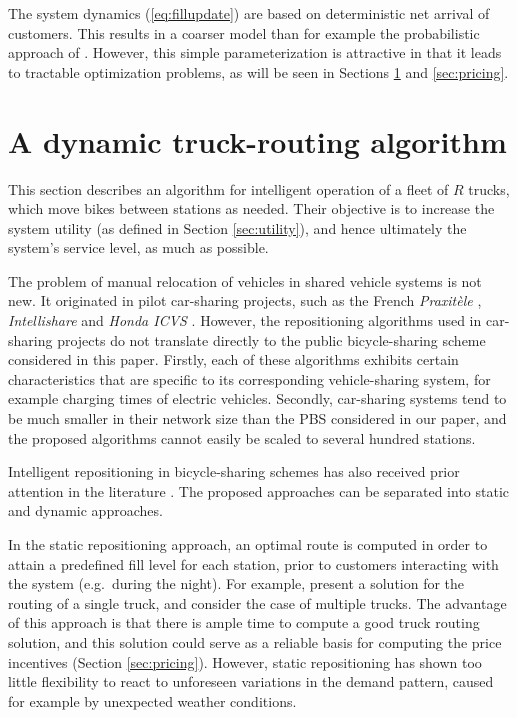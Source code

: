 \documentclass{article}
\begin{document}
The system dynamics (\ref{eq:fillupdate}) are based on deterministic net arrival
of customers. This results in a coarser model than for example the probabilistic
approach of \cite{raviv_optimal_2013}. However, this simple parameterization is
attractive in that it leads to tractable optimization problems, as will be seen
in Sections \ref{sec:trucks} and \ref{sec:pricing}.

\section{A dynamic truck-routing algorithm}
\label{sec:trucks}

This section describes an algorithm for intelligent operation of a fleet of
$R$ trucks, which move bikes between stations as needed. Their objective
is to increase the system utility (as defined in Section \ref{sec:utility}), and
hence ultimately the system's service level, as much as possible.

The problem of manual relocation of vehicles in shared vehicle systems is not
new. It originated in pilot car-sharing projects, such as the French
\emph{Praxitèle} \cite{dror_redistribution_1998,duron_analysis_2000},
\emph{Intellishare} \cite{barth2004} and \emph{Honda ICVS}
\cite{kek_decision_2009}. However, the repositioning algorithms used in
car-sharing projects do not translate directly to the public bicycle-sharing
scheme considered in this paper. Firstly, each of these algorithms exhibits
certain characteristics that are specific to its corresponding vehicle-sharing
system, for example charging times of electric vehicles. Secondly, car-sharing systems
tend to be much smaller in their network size than the PBS considered in our
paper, and the proposed algorithms cannot easily be scaled to several hundred stations.

Intelligent repositioning in bicycle-sharing schemes has also received prior
attention in the literature \cite{shaheen_bikesharing_2010}. The proposed
approaches can be separated into static and dynamic approaches.

In the static repositioning approach, an optimal route is computed in order to
attain a predefined fill level for each station, prior to customers interacting
with the system (e.g.\ during the night). For example,
\cite{benchimol_balancing_2011} present a solution for the routing of a single
truck, and \cite{raviv_static_2012} consider the case of multiple trucks. The
advantage of this approach is that there is ample time to compute a good truck
routing solution, and this solution could serve as a reliable basis for
computing the price incentives (Section \ref{sec:pricing}). However, static
repositioning has shown too little flexibility to react to unforeseen variations
in the demand pattern, caused for example by unexpected weather conditions.
\end{document}

